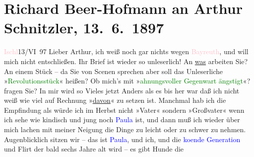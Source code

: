 

               \section[Richard Beer-Hofmann an Arthur Schnitzler, 13. 6. 1897]{ Richard Beer-Hofmann an Arthur Schnitzler,
               13. 6. 1897}\nopagebreak{}\rehead{ }\normalsize\beginnumbering{} \toendnotes[C]{\smallbreak\pagebreak[2]} 
\toendnotes[C]{\smallbreak}\pstart
           \centering{}{\pb}\textcolor{pink}{Ischl}{}\ledrightnote{\textcolor{pink}{Bad Ischl}}\hspace*{1.5em}13/VI 97\pend
           \pstart
           Lieber Arthur, ich weiß noch gar nichts wegen \textcolor{pink}{Bayreuth}{}\ledrightnote{\textcolor{pink}{Bayreuth}}, und will mich nicht entschließen.\pend
           \pstart
           Ihr Brief ist wieder so unleserlich! An \uline{was} arbeiten
               Sie? An einem Stück – da Sie von Scenen sprechen aber soll das Unleser{\pb}liche »\textcolor{green}{Revolutionsstück}{}« heißen?\pend
           \pstart
           Ob mich’s mit »\textcolor{green}{ahnungsvoller Gegenwart
                  ängstigt}{}«? fragen Sie? In mir wird so Vieles jetzt Anders als es bis her war
               daß ich nicht weiß wie viel auf Rech{\pb}nung »\uline{davon}« zu setzen ist. Manchmal hab ich die
               Empfindung als würde ich im Herbst nicht »Vater« sondern »Großvater« wenn ich sehe
               wie kindisch und jung noch \textcolor{blue}{Paula}{}\ledrightnote{\textcolor{blue}{Paula Beer-Hofmann}} ist, und dann
               muß ich wieder {\pb}über mich lachen
               mit meiner Neigung die Dinge zu leicht oder zu schwer zu nehmen. Augenblicklich
               sitzen wir – das ist \textcolor{blue}{Paula}{}\ledrightnote{\textcolor{blue}{Paula Beer-Hofmann}}, und ich, und die \textcolor{blue}{ko{\geminationm}ende
                  Generation}{} und Flirt der bald sechs Jahre {\pb}alt wird – es gibt Hunde die
